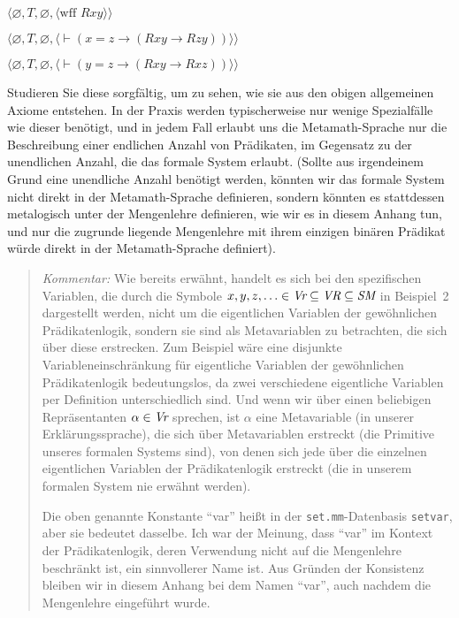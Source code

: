 \begin{list}{}{\itemsep 0.0pt}
      \item[] $\langle\varnothing,T,\varnothing,
               \langle \mbox{wff\ }R x y\rangle\rangle$
      \item[] $\langle\varnothing,T,\varnothing,
               \langle \vdash(x=z
                  \to(R x y \to R z y))
               \rangle\rangle$
      \item[] $\langle\varnothing,T,\varnothing,
               \langle \vdash(y=z
                  \to(R x y \to R x z))
               \rangle\rangle$
\end{list}
Studieren Sie diese sorgfältig, um zu sehen, wie sie aus den obigen allgemeinen Axiome entstehen.  In der Praxis werden typischerweise nur wenige Spezialfälle wie dieser benötigt, und in jedem Fall erlaubt uns die Metamath-Sprache nur die Beschreibung einer endlichen Anzahl von Prädikaten, im Gegensatz zu der unendlichen Anzahl, die das formale System erlaubt.  (Sollte aus irgendeinem Grund eine unendliche Anzahl benötigt werden, könnten wir das formale System nicht direkt in der Metamath-Sprache definieren, sondern könnten es stattdessen metalogisch unter der Mengenlehre definieren, wie wir es in diesem Anhang tun, und nur die zugrunde liegende Mengenlehre mit ihrem einzigen binären Prädikat würde direkt in der Metamath-Sprache definiert). 


{\footnotesize\begin{quotation}
{\em Kommentar:}  Wie bereits erwähnt, handelt es sich bei den spezifischen Variablen, die durch die Symbole $x,y,z,\ldots\in \mbox{\em Vr}\subseteq \mbox{\em VR}\subseteq \mbox{\em SM}$ in Beispiel~2 dargestellt werden, nicht um die eigentlichen Variablen der gewöhnlichen Prädikatenlogik, sondern sie sind als Metavariablen zu betrachten, die sich über diese erstrecken.  Zum Beispiel wäre eine disjunkte Variableneinschränkung für eigentliche Variablen der gewöhnlichen Prädikatenlogik bedeutungslos, da zwei verschiedene eigentliche Variablen per Definition unterschiedlich sind.  Und wenn wir über einen beliebigen Repräsentanten $\alpha\in \mbox{\em Vr}$ sprechen, ist $\alpha$ eine Metavariable (in unserer Erklärungssprache), die sich über Metavariablen erstreckt (die Primitive unseres formalen Systems sind), von denen sich jede über die einzelnen eigentlichen Variablen der Prädikatenlogik erstreckt (die in unserem formalen System nie erwähnt werden).  

Die oben genannte Konstante "`var"' heißt in der \texttt{set.mm}-Datenbasis \texttt{setvar}, aber sie bedeutet dasselbe.  Ich war der Meinung, dass "`var"' im Kontext der Prädikatenlogik, deren Verwendung nicht auf die Mengenlehre beschränkt ist, ein sinnvollerer Name ist.  Aus Gründen der Konsistenz bleiben wir in diesem Anhang bei dem Namen "`var"', auch nachdem die Mengenlehre eingeführt wurde.
\end{quotation}}

